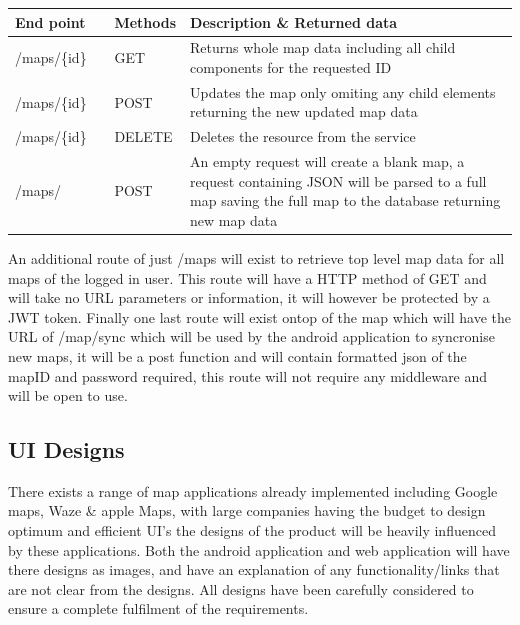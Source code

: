 \begin{longtable}{| p{0.2\linewidth} | p{0.1\linewidth} | p{0.7\linewidth}|}
	\hline
	End point & Methods & Description \& Returned data\\\hline
	/maps/\{id\} & GET & Returns whole map data including all child components for the requested ID\\\hline
	/maps/\{id\} & POST & Updates the map only omiting any child elements  returning the new updated map data\\\hline
	/maps/\{id\} & DELETE & Deletes the resource from the service\\\hline
	/maps/ & POST & An empty request will create a blank map, a request containing JSON will be parsed to a full map saving the full map to the database returning new map data\\\hline
	
\end{longtable}

An additional route of just /maps will exist to retrieve top level map data for all maps of the logged in user. This route will have a HTTP method of GET and will take no URL parameters or information, it will however be protected by a JWT token.
Finally one last route will exist ontop of the map which will have the URL of /map/sync which will be used by the android application to syncronise new maps, it will be a post function and will contain formatted json of the mapID and password required, this route will not require any middleware and will be open to use.

\subsection{UI Designs}
There exists a range of map applications already implemented including Google maps, Waze \& apple Maps, with large companies having the budget to design optimum and efficient UI's the designs of the product will be heavily influenced by these applications. Both the android application and web application will have there designs as images, and have an explanation of any functionality/links that are not clear from the designs. All designs have been carefully considered to ensure a complete fulfilment of the requirements.

\pagebreak
